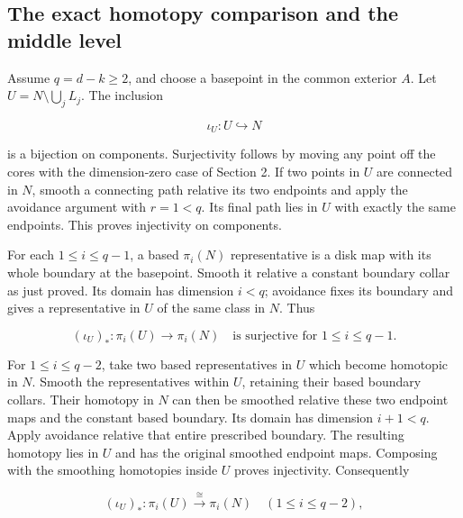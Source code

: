 \subsection{The exact homotopy comparison and the middle level}
\label{courseIII:belt-sphere-complements-and-the-whitney-disk:belt-homotopy}

\label{courseIII:belt-sphere-complements-and-the-whitney-disk:section-3}\label{courseIII:belt-complement:3}

Assume \(q=d-k\geq2\), and choose a basepoint in the common exterior \(A\). Let \(U=N\setminus\bigcup_jL_j\). The inclusion

\begin{equation}
\iota_U:U\hookrightarrow N
\label{courseIII:belt-sphere-complements-and-the-whitney-disk:eq:3.1}
\end{equation}

is a bijection on components. Surjectivity follows by moving any point off the cores with the dimension-zero case of Section 2. If two points in \(U\) are connected in \(N\), smooth a connecting path relative its two endpoints and apply the avoidance argument with \(r=1<q\). Its final path lies in \(U\) with exactly the same endpoints. This proves injectivity on components.

For each \(1\leq i\leq q-1\), a based \(\pi_i(N)\) representative is a disk map with its whole boundary at the basepoint. Smooth it relative a constant boundary collar as just proved. Its domain has dimension \(i<q\); avoidance fixes its boundary and gives a representative in \(U\) of the same class in \(N\). Thus

\begin{equation}
(\iota_U)_*:\pi_i(U)\longrightarrow\pi_i(N)
\quad\text{is surjective for }1\leq i\leq q-1.
\label{courseIII:belt-sphere-complements-and-the-whitney-disk:eq:3.2}
\end{equation}

For \(1\leq i\leq q-2\), take two based representatives in \(U\) which become homotopic in \(N\). Smooth the representatives within \(U\), retaining their based boundary collars. Their homotopy in \(N\) can then be smoothed relative these two endpoint maps and the constant based boundary. Its domain has dimension \(i+1<q\). Apply avoidance relative that entire prescribed boundary. The resulting homotopy lies in \(U\) and has the original smoothed endpoint maps. Composing with the smoothing homotopies inside \(U\) proves injectivity. Consequently

\begin{equation}
(\iota_U)_*:\pi_i(U)\xrightarrow{\ \cong\ }\pi_i(N)
\quad(1\leq i\leq q-2),
\label{courseIII:belt-sphere-complements-and-the-whitney-disk:eq:3.3}
\end{equation}

